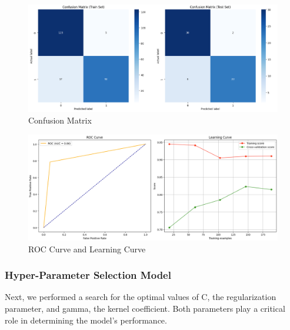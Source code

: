 \begin{figure}[H]
    \centering
    \includegraphics[width=1\linewidth]{images/confusion_matrix_svc_base.png}
    \caption{Confusion Matrix}
    \label{fig:enter-label}
\end{figure}
\begin{figure}[H]
    \centering
    \includegraphics[width=1\linewidth]{images/roc_learning_svc_base.png}
    \caption{ROC Curve and Learning Curve}%
    \label{fig:enter-label}
\end{figure}

\subsubsection{Hyper-Parameter Selection Model}

Next, we performed a search for the optimal values of C, the regularization parameter, and gamma, the kernel coefficient. Both parameters play a critical role in determining the model's performance.

